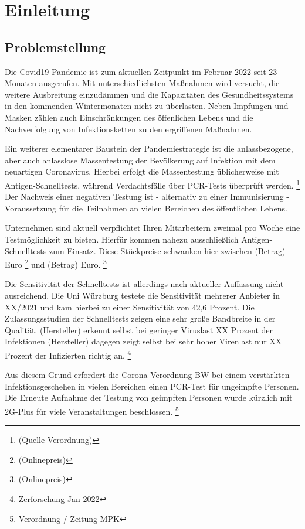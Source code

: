 \chapter{Einleitung}
\section{Problemstellung}
Die Covid19-Pandemie ist zum aktuellen Zeitpunkt im Februar 2022 seit 23 Monaten ausgerufen.
Mit unterschiedlichsten Maßnahmen wird versucht, die weitere Ausbreitung einzudämmen und die Kapazitäten des Gesundheitssystems in den kommenden Wintermonaten nicht zu überlasten.
Neben Impfungen und Masken zählen auch Einschränkungen des öffenlichen Lebens und die Nachverfolgung von Infektionsketten zu den ergriffenen Maßnahmen.

Ein weiterer elementarer Baustein der Pandemiestrategie ist die anlassbezogene, aber auch anlasslose Massentestung der Bevölkerung auf Infektion mit dem neuartigen Coronavirus.
Hierbei erfolgt die Massentestung üblicherweise mit Antigen-Schnelltests, während Verdachtsfälle über PCR-Tests überprüft werden.
\footnote{(Quelle Verordnung)}
 Der Nachweis einer negativen Testung ist - alternativ zu einer Immunisierung - Voraussetzung für die Teilnahmen an vielen Bereichen des öffentlichen Lebens.

Unternehmen sind aktuell verpflichtet Ihren Mitarbeitern zweimal pro Woche eine Testmöglichkeit zu bieten.
Hierfür kommen nahezu ausschließlich Antigen-Schnelltests zum Einsatz.
Diese Stückpreise schwanken hier zwischen (Betrag) Euro
\footnote{(Onlinepreis)}
und (Betrag) Euro.
\footnote{(Onlinepreis)}

Die Sensitivität der Schnelltests ist allerdings nach aktueller Auffassung nicht ausreichend.
Die Uni Würzburg testete die Sensitivität mehrerer Anbieter in XX/2021 und kam hierbei zu einer Sensitivität von 42,6 Prozent.
Die Zulassungsstudien der Schnelltests zeigen eine sehr große Bandbreite in der Qualität.
(Hersteller) erkennt selbst bei geringer Viruslast XX Prozent der Infektionen
(Hersteller) dagegen zeigt selbst bei sehr hoher Virenlast nur XX Prozent der Infizierten richtig an.
\footnote{Zerforschung Jan 2022}

Aus diesem Grund erfordert die Corona-Verordnung-BW bei einem verstärkten Infektionsgeschehen in vielen Bereichen einen PCR-Test für ungeimpfte Personen.
Die Erneute Aufnahme der Testung von geimpften Personen wurde kürzlich mit 2G-Plus für viele Veranstaltungen beschlossen.
\footnote{Verordnung / Zeitung MPK}

